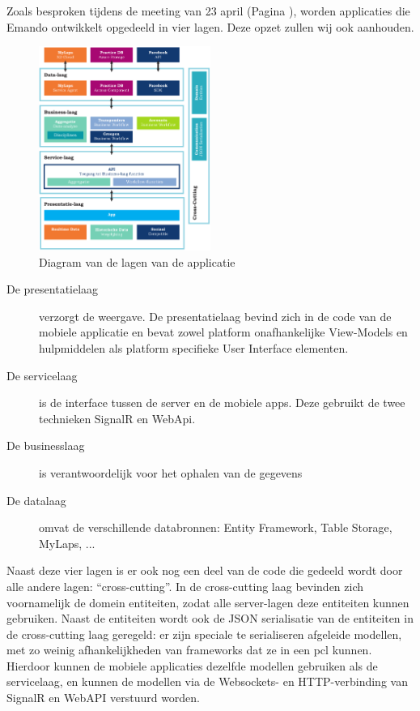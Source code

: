 Zoals besproken tijdens de meeting van 23 april (Pagina \pageref{sec:meeting-23-apr}), worden applicaties die Emando ontwikkelt opgedeeld in vier lagen. Deze opzet zullen wij ook aanhouden.

\begin{figure}[ht]
  \begin{center}
    \includegraphics[width=0.5\textwidth]{style/images/Layers}
  \end{center}
  \label{fig:diagram-layers}
  \caption{Diagram van de lagen van de applicatie}
\end{figure}

\begin{description}
\item[De presentatielaag] verzorgt de weergave. De presentatielaag bevind zich in de code van de mobiele applicatie en bevat zowel platform onafhankelijke View-Models en hulpmiddelen als platform specifieke User Interface elementen.
\item[De servicelaag] is de interface tussen de server en de mobiele apps. Deze gebruikt de twee technieken SignalR en WebApi.
\item[De businesslaag] {\color{red} is verantwoordelijk voor het ophalen van de gegevens}
\item[De datalaag] {\color{red} omvat de verschillende databronnen: Entity Framework, Table Storage, MyLaps, ...}
\end{description}

Naast deze vier lagen is er ook nog een deel van de code die gedeeld wordt door alle andere lagen: ``cross-cutting''. In de cross-cutting laag bevinden zich voornamelijk de domein entiteiten, zodat alle server-lagen deze entiteiten kunnen gebruiken. Naast de entiteiten wordt ook de JSON serialisatie van de entiteiten in de cross-cutting laag geregeld: er zijn  speciale te serialiseren afgeleide modellen, met zo weinig afhankelijkheden van frameworks dat ze in een \ac{pcl} kunnen. Hierdoor kunnen de mobiele applicaties dezelfde modellen gebruiken als de servicelaag, en kunnen de modellen via de Websockets- en HTTP-verbinding van SignalR en WebAPI verstuurd worden.

